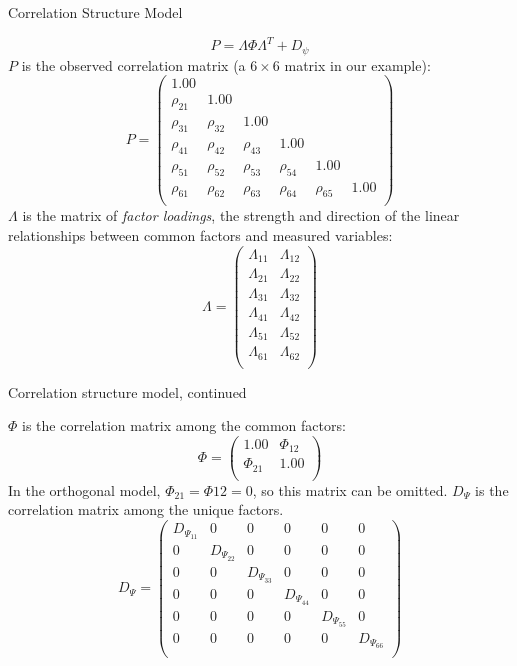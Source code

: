 \documentclass[10pt,ignorenonframetext,]{beamer}
\begin{document}
\begin{frame}{Correlation Structure Model}

\[
P = \Lambda \Phi \Lambda^T + D_\psi
\] \(P\) is the observed correlation matrix (a \(6 \times 6\) matrix in
our example): \[
P = \begin{pmatrix}
1.00 \\
\rho_{21} & 1.00 \\
\rho_{31} & \rho_{32} & 1.00 \\
\rho_{41} & \rho_{42} & \rho_{43} & 1.00 \\
\rho_{51} & \rho_{52} & \rho_{53} & \rho_{54} & 1.00 \\
\rho_{61} & \rho_{62} & \rho_{63} & \rho_{64} & \rho_{65} & 1.00 \\
\end{pmatrix}
\] \(\Lambda\) is the matrix of \emph{factor loadings}, the strength and
direction of the linear relationships between common factors and
measured variables: \[
\Lambda = \begin{pmatrix}
\Lambda_{11} & \Lambda_{12} \\
\Lambda_{21} & \Lambda_{22} \\
\Lambda_{31} & \Lambda_{32} \\
\Lambda_{41} & \Lambda_{42} \\
\Lambda_{51} & \Lambda_{52} \\
\Lambda_{61} & \Lambda_{62} \\
\end{pmatrix}
\]

\end{frame}

\begin{frame}{Correlation structure model, continued}

\(\Phi\) is the correlation matrix among the common factors: \[
\Phi = \begin{pmatrix}
1.00 & \Phi_{12}\\
\Phi_{21} & 1.00 \\
\end{pmatrix}
\] In the orthogonal model, \(\Phi_{21} = \Phi{12} = 0\), so this matrix
can be omitted. \(D_\Psi\) is the correlation matrix among the unique
factors. \[
D_\Psi = \begin{pmatrix}
D_{\Psi_{11}} & 0 & 0 & 0 & 0 & 0 \\
0 & D_{\Psi_{22}} & 0 & 0 & 0 & 0\\
0 & 0 & D_{\Psi_{33}} & 0 & 0 & 0 \\
0 & 0 & 0 & D_{\Psi_{44}} & 0 & 0 \\
0 & 0 & 0 & 0 & D_{\Psi_{55}} & 0 \\
0 & 0 & 0 & 0 & 0 & D_{\Psi_{66}} \\
\end{pmatrix}
\]

\end{frame}
\end{document}
